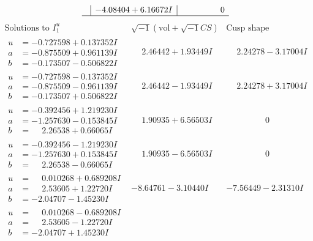 \documentclass[1p]{elsarticle_modified}
\theoremstyle{definition}
\newcommand{\I}{\sqrt{-1}}
\begin{document}
$$\begin{array}{c|c|c}
 & -4.08404 + 6.16672 I & \phantom{-0.000000 } 0\\
 \hline 
 \end{array}$$\newpage$$\begin{array}{c|c|c}  
\text{Solutions to }I^u_{1}& \I (\text{vol} + \sqrt{-1}CS) & \text{Cusp shape}\\
 \hline 
\begin{aligned}
u &= -0.727598 + 0.137352 I \\
a &= -0.875509 + 0.961139 I \\
b &= -0.173507 - 0.506822 I\end{aligned}
 & \phantom{-}2.46442 + 1.93449 I & \phantom{-}2.24278 - 3.17004 I \\ \hline\begin{aligned}
u &= -0.727598 - 0.137352 I \\
a &= -0.875509 - 0.961139 I \\
b &= -0.173507 + 0.506822 I\end{aligned}
 & \phantom{-}2.46442 - 1.93449 I & \phantom{-}2.24278 + 3.17004 I \\ \hline\begin{aligned}
u &= -0.392456 + 1.219230 I \\
a &= -1.257630 - 0.153845 I \\
b &= \phantom{-}2.26538 + 0.66065 I\end{aligned}
 & \phantom{-}1.90935 + 6.56503 I & \phantom{-0.000000 } 0 \\ \hline\begin{aligned}
u &= -0.392456 - 1.219230 I \\
a &= -1.257630 + 0.153845 I \\
b &= \phantom{-}2.26538 - 0.66065 I\end{aligned}
 & \phantom{-}1.90935 - 6.56503 I & \phantom{-0.000000 } 0 \\ \hline\begin{aligned}
u &= \phantom{-}0.010268 + 0.689208 I \\
a &= \phantom{-}2.53605 + 1.22720 I \\
b &= -2.04707 - 1.45230 I\end{aligned}
 & -8.64761 - 3.10440 I & -7.56449 - 2.31310 I \\ \hline\begin{aligned}
u &= \phantom{-}0.010268 - 0.689208 I \\
a &= \phantom{-}2.53605 - 1.22720 I \\
b &= -2.04707 + 1.45230 I\end{aligned}

\end{array}$$
\end{document}
